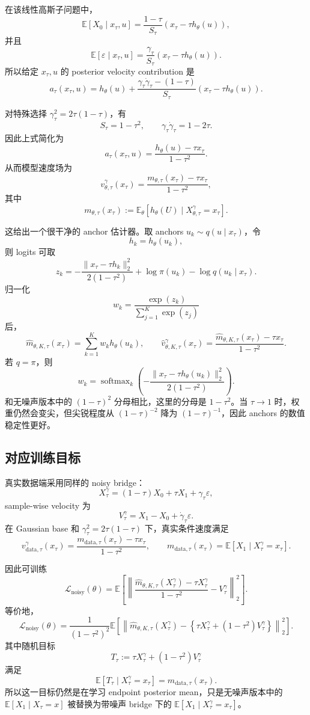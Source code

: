 \documentclass[UTF8,11pt]{ctexart}
\newcommand{\E}{\mathbb{E}}
\newcommand{\cL}{\mathcal{L}}
\newcommand{\softmax}{\operatorname{softmax}}
\begin{document}
在该线性高斯子问题中，
\[
\E[X_0\mid x_\tau,u]
=
\frac{1-\tau}{S_\tau}
\left(
x_\tau-\tau h_\theta(u)
\right),
\]
并且
\[
\E[\varepsilon\mid x_\tau,u]
=
\frac{\gamma_\tau}{S_\tau}
\left(
x_\tau-\tau h_\theta(u)
\right).
\]
所以给定 \(x_\tau,u\) 的 posterior velocity contribution 是
\[
a_\tau(x_\tau,u)
=
h_\theta(u)
+
\frac{
\gamma_\tau\dot\gamma_\tau-(1-\tau)
}{
S_\tau
}
\left(
x_\tau-\tau h_\theta(u)
\right).
\]

对特殊选择 \(\gamma_\tau^2=2\tau(1-\tau)\)，有
\[
S_\tau=1-\tau^2,
\qquad
\gamma_\tau\dot\gamma_\tau=1-2\tau.
\]
因此上式简化为
\[
a_\tau(x_\tau,u)
=
\frac{
h_\theta(u)-\tau x_\tau
}{
1-\tau^2
}.
\]
从而模型速度场为
\[
v_{\theta,\tau}^{\gamma}(x_\tau)
=
\frac{
m_{\theta,\tau}(x_\tau)-\tau x_\tau
}{
1-\tau^2
},
\]
其中
\[
m_{\theta,\tau}(x_\tau)
:=
\E_\theta[h_\theta(U)\mid X_{\theta,\tau}^{\gamma}=x_\tau].
\]

这给出一个很干净的 anchor 估计器。取 anchors \(u_k\sim q(u\mid x_\tau)\)，令
\[
h_k=h_\theta(u_k),
\]
则 logits 可取
\[
z_k
=
-
\frac{
\|x_\tau-\tau h_k\|_2^2
}{
2(1-\tau^2)
}
+
\log\pi(u_k)
-
\log q(u_k\mid x_\tau).
\]
归一化
\[
w_k=\frac{\exp(z_k)}{\sum_{j=1}^K\exp(z_j)}
\]
后，
\[
\widehat m_{\theta,K,\tau}(x_\tau)
=
\sum_{k=1}^K w_k h_\theta(u_k),
\qquad
\widehat v_{\theta,K,\tau}^{\gamma}(x_\tau)
=
\frac{
\widehat m_{\theta,K,\tau}(x_\tau)-\tau x_\tau
}{
1-\tau^2
}.
\]
若 \(q=\pi\)，则
\[
w_k
=
\softmax_k
\left(
-
\frac{
\|x_\tau-\tau h_\theta(u_k)\|_2^2
}{
2(1-\tau^2)
}
\right).
\]
和无噪声版本中的 \((1-\tau)^2\) 分母相比，这里的分母是
\(1-\tau^2\)。当 \(\tau\to 1\) 时，权重仍然会变尖，但尖锐程度从
\((1-\tau)^{-2}\) 降为 \((1-\tau)^{-1}\)，因此 anchors 的数值稳定性更好。

\subsection{对应训练目标}

真实数据端采用同样的 noisy bridge：
\[
X_\tau^{\gamma}
=
(1-\tau)X_0+\tau X_1+\gamma_\tau\varepsilon,
\]
sample-wise velocity 为
\[
V_\tau^{\gamma}
=
X_1-X_0+\dot\gamma_\tau\varepsilon.
\]
在 Gaussian base 和
\(\gamma_\tau^2=2\tau(1-\tau)\) 下，真实条件速度满足
\[
v_{\mathrm{data},\tau}^{\gamma}(x_\tau)
=
\frac{
m_{\mathrm{data},\tau}(x_\tau)-\tau x_\tau
}{
1-\tau^2
},
\qquad
m_{\mathrm{data},\tau}(x_\tau)
=
\E[X_1\mid X_\tau^{\gamma}=x_\tau].
\]

因此可训练
\[
\cL_{\mathrm{noisy}}(\theta)
=
\E
\left[
\left\|
\frac{
\widehat m_{\theta,K,\tau}(X_\tau^{\gamma})-\tau X_\tau^{\gamma}
}{
1-\tau^2
}
-V_\tau^{\gamma}
\right\|_2^2
\right].
\]
等价地，
\[
\cL_{\mathrm{noisy}}(\theta)
=
\frac{1}{(1-\tau^2)^2}
\E
\left[
\left\|
\widehat m_{\theta,K,\tau}(X_\tau^{\gamma})
-
\left\{
\tau X_\tau^{\gamma}+(1-\tau^2)V_\tau^{\gamma}
\right\}
\right\|_2^2
\right].
\]
其中随机目标
\[
T_\tau
:=
\tau X_\tau^{\gamma}+(1-\tau^2)V_\tau^{\gamma}
\]
满足
\[
\E[T_\tau\mid X_\tau^{\gamma}=x_\tau]
=
m_{\mathrm{data},\tau}(x_\tau).
\]
所以这一目标仍然是在学习 endpoint posterior mean，只是无噪声版本中的
\(\E[X_1\mid X_\tau=x]\) 被替换为带噪声 bridge 下的
\(\E[X_1\mid X_\tau^{\gamma}=x_\tau]\)。
\end{document}
